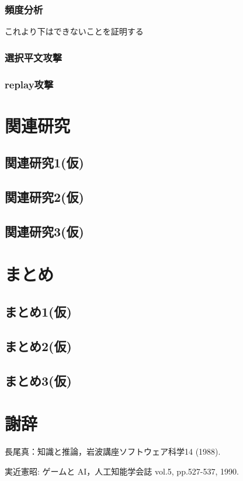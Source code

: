 \documentclass{jsarticle}
\begin{document}
\subsubsection{頻度分析}
これより下はできないことを証明する
\subsubsection{選択平文攻撃}
\subsubsection{replay攻撃}
\section{関連研究}
\subsection{関連研究1(仮)}
\subsection{関連研究2(仮)}
\subsection{関連研究3(仮)}
\section{まとめ}
\subsection{まとめ1(仮)}
\subsection{まとめ2(仮)}
\subsection{まとめ3(仮)}
\section{謝辞}

\newpage 

\begin{thebibliography}{}

 長尾真：知識と推論，岩波講座ソフトウェア科学14 (1988). 

 実近憲昭: ゲームと AI，人工知能学会誌 vol.5, pp.527-537, 1990.

\end{thebibliography}
\end{document}
